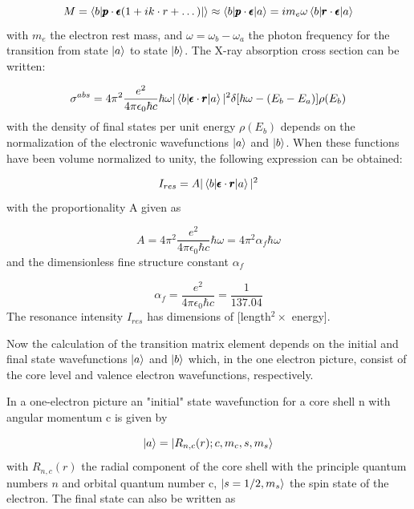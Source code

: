 \begin{equation}
M = \braket{b|\pmb{p}\cdot\pmb{\epsilon}(1+ik\cdot r + \dots)|} \approx \braket{b|\pmb{p}\cdot \pmb{\epsilon} |a} = i m_e \omega \braket{b|\pmb{r} \cdot \pmb{\epsilon} |a}
\end{equation}
with $m_e$ the electron rest mass, and $\omega=\omega_b-\omega_a$ the photon frequency for the transition from state $\ket{a}$ to state $\ket{b}$. The X-ray absorption cross section can be written:

\begin{equation}
\sigma^{abs} = 4\pi^2\frac{e^2}{4\pi\epsilon_0\hbar c}\hbar \omega |\braket{b|\pmb{\epsilon}\cdot \pmb{r}|a}|^2\delta[\hbar\omega-(E_b-E_a)]\rho(E_b)
\end{equation}
with the density of final states per unit energy $\rho(E_b)$ depends on the normalization of the electronic wavefunctions $\ket{a}$ and $\ket{b}$. When these functions have been volume normalized to unity, the following expression can be obtained:

\begin{equation}
I_{res} = A|\braket{b|\pmb{\epsilon} \cdot \pmb{r}|a}|^2
\end{equation}
with the proportionality A given as

\begin{equation}
A=4\pi^2\frac{e^2}{4\pi\epsilon_0\hbar c}\hbar\omega = 4\pi^2 \alpha_f \hbar \omega
\end{equation}
and the dimensionless fine structure constant $\alpha_f$

\begin{equation}
\alpha_f=\frac{e^2}{4\pi\epsilon_0\hbar c} = \frac{1}{137.04}
\end{equation}
The resonance intensity $I_{res}$ has dimensions of [length$^2 \times$ energy].

Now the calculation of the transition matrix element depends on the initial and final state wavefunctions $\ket{a}$ and $\ket{b}$ which, in the one electron picture, consist of the core level and valence electron wavefunctions, respectively.

In a one-electron picture an "initial" state wavefunction for a core shell n with angular momentum c is given by

\begin{equation}
\ket{a}=\ket{R_{n,c}(r);c,m_c,s,m_s}
\end{equation}
with $R_{n,c}(r)$ the radial component of the core shell with the principle quantum numbers $n$ and orbital quantum number c, $\ket{s=1/2,m_s}$ the spin state of the electron. The final state can also be written as

